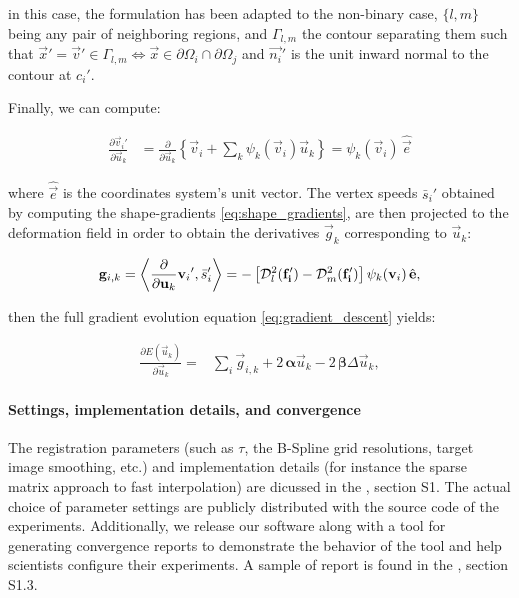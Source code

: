   in this case, the formulation has been adapted to the non-binary case, $\{l,m\}$
  being any pair of neighboring regions, and $\Gamma_{l,m}$ the contour separating
  them such that $\vec{x}' = \vec{v}' \in\Gamma_{l,m} \iff \vec{x}\in \partial\Omega_i \cap \partial\Omega_j$
  and $\vec{n_i}'$ is the unit inward normal to the contour at $c_i'$.


Finally, we can compute:

  \begin{align}
  \frac{\partial \vec{v}_i'}{\partial \vec{u}_k} &= \frac{\partial}{\partial \vec{u}_k}
  \left\{ \vec{v}_i + \sum_k \psi_k(\vec{v}_i) \vec{u}_k \right\}
  = \psi_k(\vec{v}_i)\, \hat{\vec{e}}
  \label{eq:basis_derivative}
  \end{align}

  where $\hat{\vec{e}}$ is the coordinates system's unit vector.
The vertex speeds $\bar{s}_i'$ obtained by computing the shape-gradients \eqref{eq:shape_gradients},
	are then projected to the deformation field in order to obtain the derivatives $\vec{g}_k$
	corresponding to $\vec{u}_k$:

  \begin{equation}
  \vec{g}_{i,k} = \left\langle \frac{\partial}{\partial \vec{u}_k}{\vec{v}_i}', \bar{s}_i'\right\rangle
  = - \left[ \mdist{f_i'}{l} - \mdist{f_i'}{m} \right] \psi_k(\vec{v}_i)\, \hat{\vec{e}},
  \end{equation}

  then the full gradient evolution equation \eqref{eq:gradient_descent} yields:

  \begin{align}
  \frac{\partial E(\vec{u}_k)}{\partial \vec{u}_k} =
  &\underset{i}{\sum} \vec{g}_{i,k} +2\, \boldsymbol{\alpha} \vec{u}_k
  -2\, \boldsymbol{\beta} \Delta \vec{u}_k,
  \label{eq:gradient_final}
  \end{align}

\paragraph*{Settings, implementation details, and convergence}
\label{sec:conv_report}
The registration parameters (such as $\tau$, the B-Spline grid resolutions,
  target image smoothing, etc.) and implementation details (for instance the sparse matrix approach
  to fast interpolation) are dicussed in the \suppl{}, {\color{red} section S1}.
The actual choice of parameter settings are publicly distributed with the source code of the experiments.
Additionally, we release our software along with a tool for generating convergence reports to
  demonstrate the behavior of the tool and help scientists configure their experiments.
A sample of report is found in the \suppl{} {\color{red}, section S1.3}.



